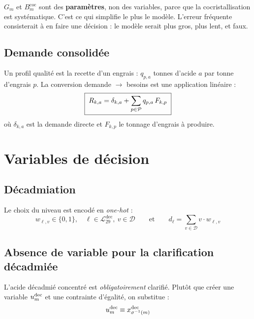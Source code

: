 \begin{encadre}[title={Point de méthode essentiel}]
$G_m$ et $B^{\mathrm{coc}}_m$ sont des \textbf{paramètres}, non des variables, parce que la
cocristallisation est systématique. C'est ce qui simplifie le plus le modèle. L'erreur
fréquente consisterait à en faire une décision : le modèle serait plus gros, plus lent, et
faux.
\end{encadre}

\subsection{Demande consolidée}

Un profil qualité est la recette d'un engrais : $q_{p,a}$ tonnes d'acide $a$ par tonne
d'engrais $p$. La conversion demande $\to$ besoins est une application linéaire :
\begin{equation}
\boxed{\;R_{k,a} = \delta_{k,a} + \sum_{p \in \mathcal{P}} q_{p,a} \, F_{k,p}\;}
\label{eq:besoins}
\end{equation}
où $\delta_{k,a}$ est la demande directe et $F_{k,p}$ le tonnage d'engrais à produire.

\section{Variables de décision}

\subsection{Décadmiation}

Le choix du niveau est encodé en \emph{one-hot} :
\begin{equation}
w_{\ell,v} \in \{0,1\}, \quad \ell \in \mathcal{L}^{\mathrm{dec}}_{29},\ v \in \mathcal{D}
\qquad\text{et}\qquad
d_\ell = \sum_{v \in \mathcal{D}} v \cdot w_{\ell,v}
\end{equation}

\subsection{Absence de variable pour la clarification décadmiée}

L'acide décadmié concentré est \emph{obligatoirement} clarifié. Plutôt que créer une
variable $u^{\mathrm{dec}}_m$ et une contrainte d'égalité, on substitue :
\begin{equation}
u^{\mathrm{dec}}_m \equiv x^{\mathrm{dec}}_{\sigma^{-1}(m)}
\label{eq:substitution-udec}
\end{equation}

